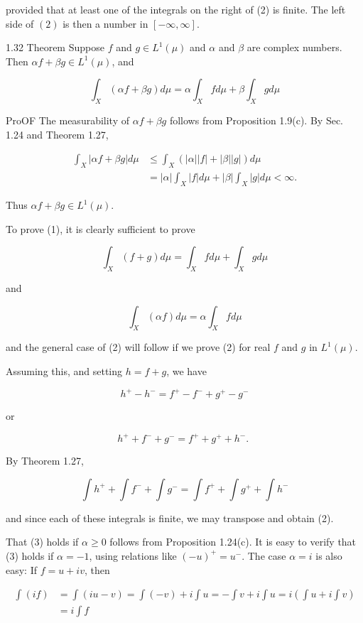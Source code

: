 \documentclass[10pt]{article}
\begin{document}
provided that at least one of the integrals on the right of (2) is finite. The left side of $(2)$ is then a number in $[-\infty, \infty]$.

1.32 Theorem Suppose $f$ and $g \in L^{1}(\mu)$ and $\alpha$ and $\beta$ are complex numbers. Then $\alpha f+\beta g \in L^{1}(\mu)$, and

$$
\int_{X}(\alpha f+\beta g) d \mu=\alpha \int_{X} f d \mu+\beta \int_{X} g d \mu
$$

ProOF The measurability of $\alpha f+\beta g$ follows from Proposition 1.9(c). By Sec. 1.24 and Theorem 1.27,

$$
\begin{aligned}
\int_{X}|\alpha f+\beta g| d \mu & \leq \int_{X}(|\alpha||f|+|\beta||g|) d \mu \\
& =|\alpha| \int_{X}|f| d \mu+|\beta| \int_{X}|g| d \mu<\infty .
\end{aligned}
$$

Thus $\alpha f+\beta g \in L^{1}(\mu)$.

To prove (1), it is clearly sufficient to prove

$$
\int_{X}(f+g) d \mu=\int_{X} f d \mu+\int_{X} g d \mu
$$

and

$$
\int_{X}(\alpha f) d \mu=\alpha \int_{X} f d \mu
$$

and the general case of (2) will follow if we prove (2) for real $f$ and $g$ in $L^{1}(\mu)$.

Assuming this, and setting $h=f+g$, we have

$$
h^{+}-h^{-}=f^{+}-f^{-}+g^{+}-g^{-}
$$

or

$$
h^{+}+f^{-}+g^{-}=f^{+}+g^{+}+h^{-} \text {. }
$$

By Theorem 1.27,

$$
\int h^{+}+\int f^{-}+\int g^{-}=\int f^{+}+\int g^{+}+\int h^{-}
$$

and since each of these integrals is finite, we may transpose and obtain (2).

That (3) holds if $\alpha \geq 0$ follows from Proposition 1.24(c). It is easy to verify that (3) holds if $\alpha=-1$, using relations like $(-u)^{+}=u^{-}$. The case $\alpha=i$ is also easy: If $f=u+i v$, then

$$
\begin{aligned}
\int(i f) & =\int(i u-v)=\int(-v)+i \int u=-\int v+i \int u=i\left(\int u+i \int v\right) \\
& =i \int f
\end{aligned}
$$
\end{document}
